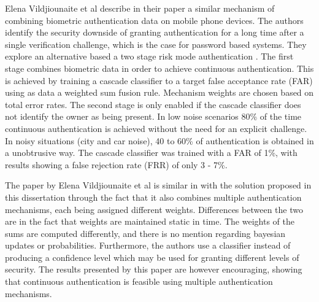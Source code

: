 Elena Vildjiounaite et al describe in their paper \cite{vildjiounaite2007increasing} a similar mechanism of combining biometric authentication data on mobile phone devices. The authors identify the security downside of granting authentication for a long time after a single verification challenge, which is the case for password based systems. They explore an alternative based a two stage risk mode authentication \cite{williamson2006enhanced}. The first stage combines biometric data in order to achieve continuous authentication. This is achieved by training a cascade classifier to a target false acceptance rate (FAR) using as data a weighted sum fusion rule. Mechanism weights are chosen based on total error rates. The second stage is only enabled if the cascade classifier does not identify the owner as being present. In low noise scenarios 80\% of the time continuous authentication is achieved without the need for an explicit challenge. In noisy situations (city and car noise), 40 to 60\% of authentication is obtained in a unobtrusive way. The cascade classifier was trained with a FAR of 1\%, with results showing a false rejection rate (FRR) of only 3 - 7\%.

The paper by Elena Vildjiounaite et al \cite{vildjiounaite2007increasing} is similar in with the solution proposed in this dissertation through the fact that it also combines multiple authentication mechanisms, each being assigned different weights. Differences between the two are in the fact that weights are maintained static in time. The weights of the sums are computed differently, and there is no mention regarding bayesian updates or probabilities. Furthermore, the authors use a classifier instead of producing a confidence level which may be used for granting different levels of security. The results presented by this paper are however encouraging, showing that continuous authentication is feasible using multiple authentication mechanisms.